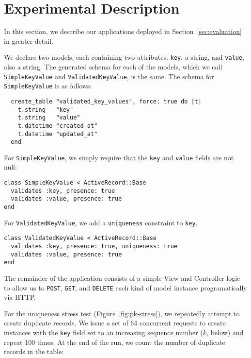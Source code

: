 \section{Experimental Description}

\lstset{language=Ruby,basicstyle=\ttfamily,columns=fullflexible}

In this section, we describe our applications deployed in Section~\ref{sec:evaluation} in greater detail.

 We declare two models, each containing two attributes: \texttt{key}, a string, and \texttt{value}, also a string. The generated schema for each of the models, which we call \texttt{SimpleKeyValue} and \texttt{ValidatedKeyValue}, is the same. The schema for \texttt{SimpleKeyValue} is as follows:

\begin{lstlisting}
  create_table "validated_key_values", force: true do |t|
    t.string   "key"
    t.string   "value"
    t.datetime "created_at"
    t.datetime "updated_at"
  end
\end{lstlisting}

For \texttt{SimpleKeyValue}, we simply require that the \texttt{key} and \texttt{value} fields are not null:

\begin{lstlisting}
class SimpleKeyValue < ActiveRecord::Base
  validates :key, presence: true
  validates :value, presence: true
end
\end{lstlisting}

For \texttt{ValidatedKeyValue}, we add a \texttt{uniqueness} constraint to \texttt{key}.

\begin{lstlisting}
class ValidatedKeyValue < ActiveRecord::Base
  validates :key, presence: true, uniqueness: true
  validates :value, presence: true
end
\end{lstlisting}

The remainder of the application consists of a simple View and Controller logic to allow us to \texttt{POST}, \texttt{GET}, and \texttt{DELETE} each kind of model instance programatically via HTTP.

 For the uniqueness stress test (Figure~\ref{fig:pk-stress}), we repeatedly attempt to create duplicate records. We issue a set of 64 concurrent requests to create instances with the \texttt{key} field set to an increasing sequence number ($k$, below) and repeat 100 times. At the end of the run, we count the number of duplicate records in the table:

